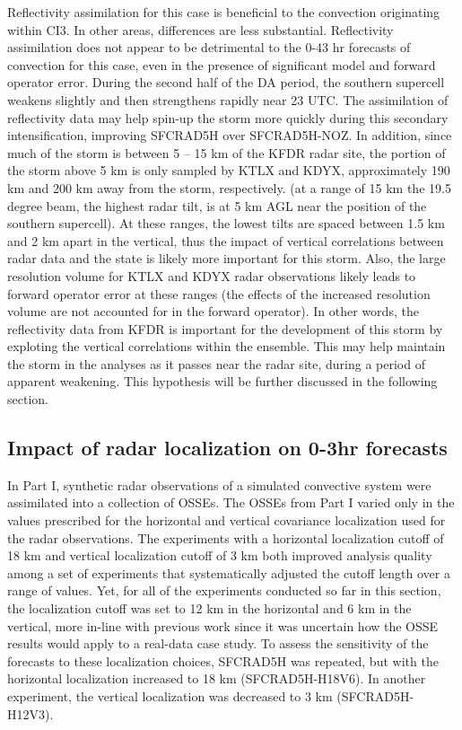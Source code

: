Reflectivity assimilation for this case is beneficial to the convection originating within CI3. In other areas, differences are less substantial. Reflectivity assimilation does not appear to be detrimental to the 0-43 hr forecasts of convection for this case, even in the presence of significant model and forward operator error. During the second half of the DA period, the southern supercell weakens slightly and then strengthens rapidly near 23 UTC. The assimilation of reflectivity data may help spin-up the storm more quickly during this secondary intensification, improving SFCRAD5H over SFCRAD5H-NOZ. In addition, since much of the storm is between 5 -- 15 km of the KFDR radar site, the portion of the storm above 5 km is only sampled by KTLX and KDYX, approximately 190 km and 200 km away from the storm, respectively. (at a range of 15 km the 19.5 degree beam, the highest radar tilt, is at 5 km AGL near the position of the southern supercell). At these ranges, the lowest tilts are spaced between 1.5 km and 2 km apart in the vertical, thus the impact of vertical correlations between radar data and the state is likely more important for this storm. Also, the large resolution volume for KTLX and KDYX radar observations likely leads to forward operator error at these ranges (the effects of the increased resolution volume are not accounted for in the forward operator). In other words, the reflectivity data from KFDR is important for the development of this storm by exploting the vertical correlations within the ensemble. This may help maintain the storm in the analyses as it passes near the radar site, during a period of apparent weakening. This hypothesis will be further discussed in the following section.

\subsection{Impact of radar localization on 0-3hr forecasts}
In Part I, synthetic radar observations of a simulated convective system were assimilated into a collection of OSSEs. The OSSEs from Part I varied only in the values prescribed for the horizontal and vertical covariance localization used for the radar observations. The experiments with a horizontal localization cutoff of 18 km and vertical localization cutoff of 3 km both improved analysis quality among a set of experiments that systematically adjusted the cutoff length over a range of values. Yet, for all of the experiments conducted so far in this section, the localization cutoff was set to 12 km in the horizontal and 6 km in the vertical, more in-line with previous work since it was uncertain how the OSSE results would apply to a real-data case study. To assess the sensitivity of the forecasts to these localization choices, SFCRAD5H was repeated, but with the horizontal localization increased to 18 km (SFCRAD5H-H18V6). In another experiment, the vertical localization was decreased to 3 km (SFCRAD5H-H12V3).

